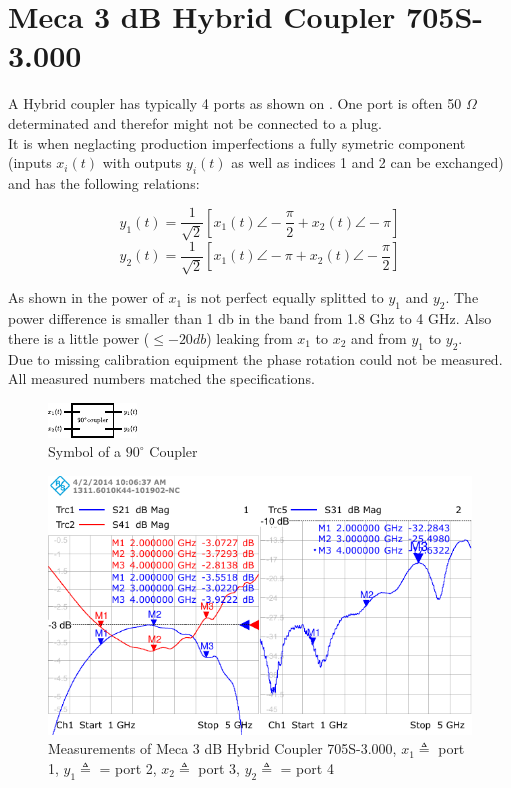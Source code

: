 \section{Meca 3 dB Hybrid Coupler 705S-3.000}
\label{sec:comp_90deg}

A Hybrid coupler has typically 4 ports as shown on
.
One port is often 50 $\Omega$ determinated and therefor might not be connected
to a plug. \\

It is when neglacting production imperfections a fully symetric component
(inputs $x_i(t)$ with outputs $y_i(t)$ as well as indices 1 and 2
can be exchanged) and has the following relations:

\[y_1(t) = \frac{1}{\sqrt{2}} \left[x_1(t) \angle -\frac{\pi}{2} + x_2(t) \angle -\pi \right] \]
\[y_2(t) = \frac{1}{\sqrt{2}} \left[x_1(t) \angle -\pi + x_2(t) \angle -\frac{\pi}{2} \right] \]

As shown in  the power of
$x_1$ is not perfect equally splitted to $y_1$ and $y_2$. The power difference
is smaller than 1 db in the band from 1.8 Ghz to 4 GHz.
Also there is a little power ($\leq -20 db$) leaking from $x_1$ to $x_2$ and from
$y_1$ to $y_2$. \\

Due to missing calibration equipment the phase rotation could not be measured.
All measured numbers matched the specifications.

\begin{figure}
  \centering
  \includegraphics{figures/90deg_coupler_symbol}
  \caption{Symbol of a $90^\circ$ Coupler}
  \label{fig:90deg_coupler_symbol}
\end{figure}

\begin{figure}
  \centering
  \includegraphics[width=\textwidth]{figures/Meca_705S-3_coupler_id1}
  \caption{Measurements of Meca 3 dB Hybrid Coupler 705S-3.000,
    $x_1 \triangleq $ port 1, $y_1 \triangleq $ = port 2,
    $x_2 \triangleq $ port 3, $y_2 \triangleq $ = port 4}
  \label{fig:90deg_coupler_measurement}
\end{figure}

